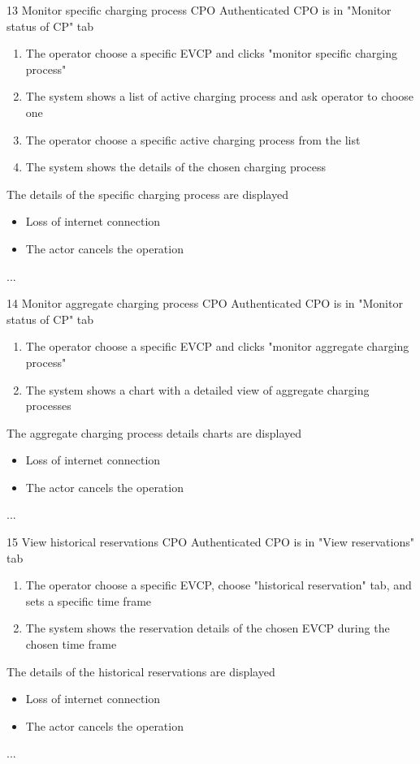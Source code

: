 \usecase
{13}
{Monitor specific charging process} %
{CPO} %
{Authenticated CPO is in "Monitor status of CP" tab} %
{ %
    \begin{enumerate}
        \item The operator choose a specific EVCP and clicks "monitor specific charging process"
        \item The system shows a list of active charging process and ask operator to choose one
        \item The operator choose a specific active charging process from the list
        \item The system shows the details of the chosen charging process
    \end{enumerate}
}
{The details of the specific charging process are displayed} %
{ %
    \begin{itemize}
        \item Loss of internet connection
        \item The actor cancels the operation
    \end{itemize}
}
{ %
    ...
}

\usecase
{14}
{Monitor aggregate charging process} %
{CPO} %
{Authenticated CPO is in "Monitor status of CP" tab} %
{ %
    \begin{enumerate}
        \item The operator choose a specific EVCP and clicks "monitor aggregate charging process"
        \item The system shows a chart with a detailed view of aggregate charging processes
    \end{enumerate}
}
{The aggregate charging process details charts are displayed} %
{ %
    \begin{itemize}
        \item Loss of internet connection
        \item The actor cancels the operation
    \end{itemize}
}
{ %
    ...
}

\usecase
{15}
{View historical reservations} %
{CPO} %
{Authenticated CPO is in "View reservations" tab} %
{ %
    \begin{enumerate}
        \item The operator choose a specific EVCP, choose "historical reservation" tab, and sets a specific time frame
        \item The system shows the reservation details of the chosen EVCP during the chosen time frame
    \end{enumerate}
}
{The details of the historical reservations are displayed} %
{ %
    \begin{itemize}
        \item Loss of internet connection
        \item The actor cancels the operation
    \end{itemize}
}
{ %
    ...
}

